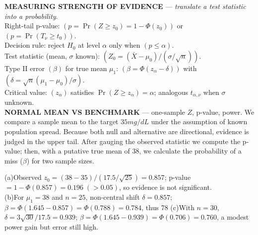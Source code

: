 \documentclass[landscape,0.4pt]{article}
\begin{document}
\begin{multicols*}{6}

\textbf{\tiny{MEASURING STRENGTH OF EVIDENCE}} — \textit{translate a test statistic into a probability}.\\
Right-tail p-value: $(p=\Pr(Z\ge z_0)=1-\Phi(z_0))$ or $(p=\Pr(T_{\nu}\ge t_0))$.\\
Decision rule: reject $H_{0}$ at level $\alpha$ only when $(p\le\alpha)$.\\
Test statistic (mean, $\sigma$ known): $(Z_0=(\bar{X}-\mu_0)/(\sigma/\sqrt{n}))$.\\
Type II error $(\beta)$ for true mean $\mu_1$: $(\beta=\Phi(z_\alpha-\delta))$ with $(\delta=\sqrt{n}(\mu_1-\mu_0)/\sigma)$.\\
Critical value: $(z_\alpha)$ satisfies $\Pr(Z\ge z_\alpha)=\alpha$; analogous $t_{\alpha,\nu}$ when $\sigma$ unknown.\\[-2pt]


\textbf{\tiny{NORMAL MEAN VS BENCHMARK}} — one-sample $Z$, p-value, power.  
We compare a sample mean to the target $35 mg/dL$ under the assumption of known population spread.  Because both null and alternative are directional, evidence is judged in the upper tail.  After gauging the observed statistic we compute the p-value; then, with a putative true mean of 38, we calculate the probability of a miss ($\beta$) for two sample sizes.

(a)\;Observed $z_0=(38-35)/(17.5/\sqrt{25})=0.857$; p-value $=1-\Phi(0.857)=0.196\;(>\!0.05)$, so evidence is not significant.\\
(b)\;For $\mu_1=38$ and $n=25$, non-central shift $\delta=0.857$; $\beta=\Phi(1.645-0.857)=\Phi(0.788)=0.784$, thus 78 %
(c)\;With $n=30$, $\delta=3\sqrt{30}/17.5=0.939$; $\beta=\Phi(1.645-0.939)=\Phi(0.706)=0.760$, a modest power gain but error still high.\\[-2pt]


\end{multicols*}
\end{document}
